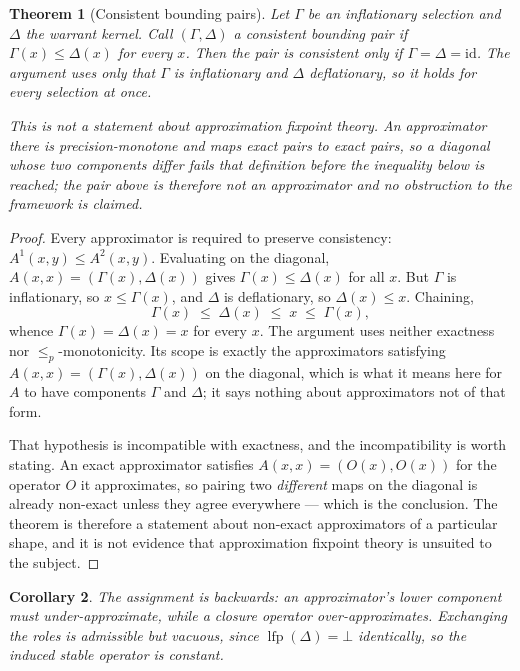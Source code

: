 \documentclass[11pt,reqno]{amsart}
\theoremstyle{plain}
\newtheorem{theorem}{Theorem}[section]
\newtheorem{corollary}[theorem]{Corollary}
\theoremstyle{definition}
\theoremstyle{remark}
\newcommand{\lfp}{\operatorname{lfp}}
\begin{document}
\begin{theorem}[Consistent bounding pairs]\label{thm:aft}
Let $\Gamma$ be an inflationary selection and $\Delta$ the warrant kernel.
Call $(\Gamma,\Delta)$ a \emph{consistent bounding pair} if
$\Gamma(x) \le \Delta(x)$ for every $x$. Then the pair is consistent only if
$\Gamma = \Delta = \mathrm{id}$. The argument uses only that $\Gamma$ is
inflationary and $\Delta$ deflationary, so it holds for every selection at once.

This is \emph{not} a statement about approximation fixpoint theory. An
approximator there is precision-monotone and maps exact pairs to exact pairs, so
a diagonal whose two components differ fails that definition before the
inequality below is reached; the pair above is therefore not an approximator and
no obstruction to the framework is claimed.
\end{theorem}

\begin{proof}
Every approximator is required to preserve consistency: $A^1(x,y) \le A^2(x,y)$.
Evaluating on the diagonal, $A(x,x) = (\Gamma(x), \Delta(x))$ gives
$\Gamma(x) \le \Delta(x)$ for all $x$. But $\Gamma$ is inflationary, so
$x \le \Gamma(x)$, and $\Delta$ is deflationary, so $\Delta(x) \le x$. Chaining,
\[
  \Gamma(x) \;\le\; \Delta(x) \;\le\; x \;\le\; \Gamma(x),
\]
whence $\Gamma(x) = \Delta(x) = x$ for every $x$. The argument uses neither exactness nor $\le_p$-monotonicity. Its scope is
exactly the approximators satisfying $A(x,x) = (\Gamma(x), \Delta(x))$ on the
diagonal, which is what it means here for $A$ to have components $\Gamma$ and
$\Delta$; it says nothing about approximators not of that form.

That hypothesis is incompatible with exactness, and the incompatibility is worth
stating. An exact approximator satisfies $A(x,x) = (O(x), O(x))$ for the operator
$O$ it approximates, so pairing two \emph{different} maps on the diagonal is
already non-exact unless they agree everywhere --- which is the conclusion. The
theorem is therefore a statement about non-exact approximators of a particular
shape, and it is not evidence that approximation fixpoint theory is unsuited to
the subject.
\end{proof}

\begin{corollary}
The assignment is backwards: an approximator's lower component must
\emph{under}-approximate, while a closure operator \emph{over}-approximates.
Exchanging the roles is admissible but vacuous, since $\lfp(\Delta) = \bot$
identically, so the induced stable operator is constant.
\end{corollary}
\end{document}
